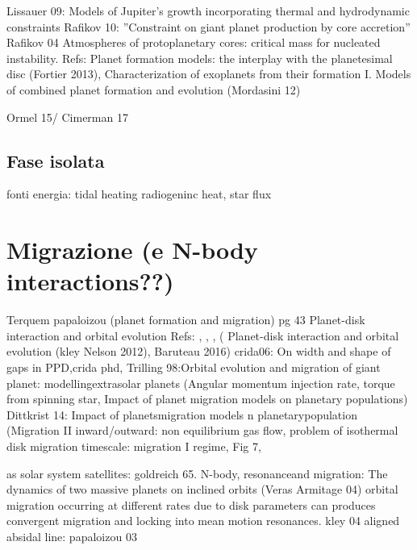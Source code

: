 \begin{workout}
Lissauer 09: Models of Jupiter’s growth incorporating thermal and hydrodynamic constraints
Rafikov 10: ''Constraint on giant planet production by core accretion''
Rafikov 04 Atmospheres of protoplanetary cores: critical mass for nucleated instability.
Refs: Planet formation models: the interplay with the planetesimal disc (Fortier 2013), Characterization of exoplanets from their formation I. Models of combined planet formation and evolution (Mordasini 12)
\end{workout}

\begin{workout}
Ormel 15/ Cimerman 17
\end{workout}

\section{Fase isolata}

fonti energia: tidal heating radiogeninc heat, star flux

{\let\clearpage\relax\let\cleardoublepage\relax
\chapter{Migrazione (e N-body interactions??)}
}

\begin{workout}
Terquem papaloizou (planet formation and migration) pg 43
Planet-disk interaction and orbital evolution
Refs: \cite{ward1997protoplanet}, \cite{terquem2000disks}, \cite{menou2004low}, (
Planet-disk interaction and orbital evolution (kley Nelson 2012), 
Baruteau 2016)
crida06: On width and shape of gaps in PPD,crida phd, 
Trilling 98:Orbital evolution and migration of giant planet: modellingextrasolar planets (Angular momentum injection rate, torque from spinning star, Impact of planet migration models on planetary populations)
Dittkrist 14: Impact of planetsmigration models n planetarypopulation (Migration II inward/outward: non equilibrium gas flow, problem of isothermal disk migration timescale: migration I regime, Fig 7,
\end{workout}

\begin{workout}
as solar system satellites: goldreich 65.
N-body, resonanceand migration: The dynamics of two massive planets on inclined orbits (Veras Armitage 04)
orbital migration occurring at different rates due to disk parameters can produces convergent migration and locking into mean motion resonances.
kley 04
aligned absidal line: papaloizou 03
\end{workout}

